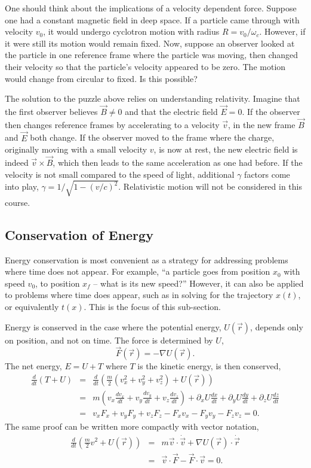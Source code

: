 One should think about the implications of a velocity dependent force. Suppose one had a constant magnetic field in deep space. If a particle came through with velocity $v_0$, it would undergo cyclotron motion with radius $R=v_0/\omega_c$. However, if it were still its motion would remain fixed. Now, suppose an observer looked at the particle in one reference frame where the particle was moving, then changed their velocity so that the particle's velocity appeared to be zero. The motion would change from circular to fixed. Is this possible?

The solution to the puzzle above relies on understanding relativity. Imagine that the first observer believes $\vec{B}\ne 0$ and that the electric field $\vec{E}=0$. If the observer then changes reference frames by accelerating to a velocity $\vec{v}$, in the new frame $\vec{B}$ and $\vec{E}$ both change. If the observer moved to the frame where the charge, originally moving with a small velocity $v$, is now at rest, the new electric field is indeed $\vec{v}\times\vec{B}$, which then leads to the same acceleration as one had before. If the velocity is not small compared to the speed of light, additional $\gamma$ factors come into play, $\gamma=1/\sqrt{1-(v/c)^2}$. Relativistic motion will not be considered in this course.

\subsection{Conservation of Energy}
\label{sec:energy}

Energy conservation is most convenient as a strategy for addressing problems where time does not appear. For example, ``a particle goes from position $x_0$ with speed $v_0$, to position $x_f$ -- what is its new speed?'' However, it can also be applied to problems where time does appear, such as in solving for the trajectory $x(t)$, or equivalently $t(x)$. This is the focus of this sub-section. 

Energy is conserved in the case where the potential energy, $U(\vec{r})$, depends only on position, and not on time. The force is determined by $U$,
\begin{equation}
\vec{F}(\vec{r})=-\nabla U(\vec{r}).
\end{equation}
The net energy, $E=U+T$ where $T$ is the kinetic energy, is then conserved,
\begin{eqnarray}
\frac{d}{dt}(T+U)&=&\frac{d}{dt}\left(\frac{m}{2}(v_x^2+v_y^2+v_z^2)+U(\vec{r})\right)\\
\nonumber
&=&m\left(v_x\frac{dv_x}{dt}+v_y\frac{dv_y}{dt}+v_z\frac{dv_z}{dt}\right)
+\partial_xU\frac{dx}{dt}+\partial_yU\frac{dy}{dt}+\partial_zU\frac{dz}{dt}\\
\nonumber
&=&v_xF_x+v_yF_y+v_zF_z-F_xv_x-F_yv_y-F_zv_z=0.
\end{eqnarray}
The same proof can be written more compactly with vector notation,
\begin{eqnarray}
\frac{d}{dt}\left(\frac{m}{2}v^2+U(\vec{r})\right)
&=&m\vec{v}\cdot\dot{\vec{v}}+\nabla U(\vec{r})\cdot\dot{\vec{r}}\\
\nonumber
&=&\vec{v}\cdot\vec{F}-\vec{F}\cdot\vec{v}=0.
\end{eqnarray}

